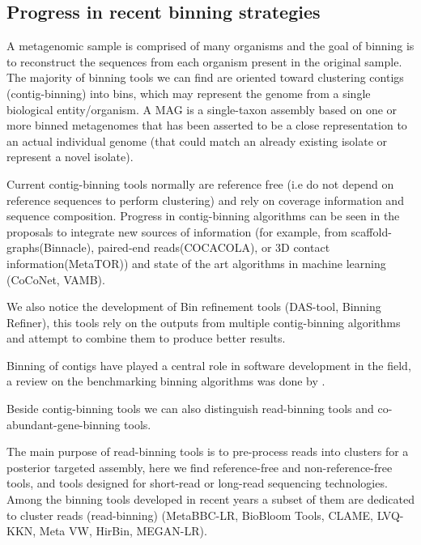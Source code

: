 \documentclass{article}
\begin{document}
\subsection{Progress in recent binning strategies}

A metagenomic sample is comprised of many organisms and the goal of binning is to reconstruct the sequences from each organism present in the original sample.
The majority of binning tools we can find are oriented toward clustering contigs (contig-binning) into bins, which may represent the genome from a single biological entity/organism. A \gls{MAG} is a single-taxon assembly based on one or more binned metagenomes that has been asserted to be a close representation to an actual individual genome (that could match an already existing isolate or represent a novel isolate).

Current contig-binning tools normally are reference free (i.e do not depend on reference sequences to perform clustering) and rely on coverage information and sequence composition.
Progress in contig-binning algorithms can be seen in the proposals to integrate new sources of information (for example, from scaffold-graphs(Binnacle), paired-end reads(COCACOLA), or 3D contact information(MetaTOR)) and state of the art algorithms in machine learning (CoCoNet, \gls{VAMB}).

We also notice the development of Bin refinement tools (DAS-tool, Binning Refiner), this tools rely on the outputs from multiple contig-binning algorithms and attempt to combine them to produce better results.

Binning of contigs have played a central role in software development in the field, a review on the benchmarking binning algorithms was done by . 

Beside contig-binning tools we can also distinguish read-binning tools and co-abundant-gene-binning tools.

The main purpose of read-binning tools is to pre-process reads into clusters for a posterior targeted assembly, here we find reference-free and non-reference-free tools, and tools designed for short-read or long-read sequencing technologies. Among the binning tools developed in recent years a subset of them are dedicated to cluster reads (read-binning) (MetaBBC-LR, BioBloom Tools, CLAME, LVQ-KKN, Meta VW, HirBin, MEGAN-LR).
\end{document}
